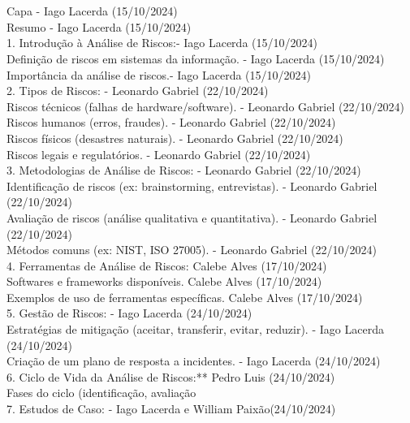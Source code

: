 \documentclass[12pt,oneside,a4paper,article]{abntex2}
\begin{document}
\section*{}
{Capa - Iago Lacerda (15/10/2024)\\
Resumo - Iago Lacerda (15/10/2024)\\
1. Introdução à Análise de Riscos:- Iago Lacerda (15/10/2024)\\
Definição de riscos em sistemas da informação. - Iago Lacerda (15/10/2024)\\
Importância da análise de riscos.- Iago Lacerda (15/10/2024)\\
2. Tipos de Riscos:  - Leonardo Gabriel (22/10/2024)\\
Riscos técnicos (falhas de hardware/software). -  Leonardo Gabriel (22/10/2024)\\
Riscos humanos (erros, fraudes). -  Leonardo Gabriel (22/10/2024)\\
Riscos físicos (desastres naturais). - Leonardo Gabriel (22/10/2024)\\
Riscos legais e regulatórios. - Leonardo Gabriel (22/10/2024)\\
3. Metodologias de Análise de Riscos: - Leonardo Gabriel (22/10/2024)
Identificação de riscos (ex: brainstorming, entrevistas). - Leonardo Gabriel (22/10/2024)\\
Avaliação de riscos (análise qualitativa e quantitativa).  - Leonardo Gabriel (22/10/2024)\\
Métodos comuns (ex: NIST, ISO 27005).  - Leonardo Gabriel (22/10/2024)\\
4. Ferramentas de Análise de Riscos: Calebe Alves (17/10/2024) \\
Softwares e frameworks disponíveis. Calebe Alves (17/10/2024)\\
Exemplos de uso de ferramentas específicas. Calebe Alves (17/10/2024) \\
5. Gestão de Riscos:  - Iago Lacerda (24/10/2024)\\
Estratégias de mitigação (aceitar, transferir, evitar, reduzir).  - Iago Lacerda (24/10/2024)\\
Criação de um plano de resposta a incidentes.  - Iago Lacerda (24/10/2024)\\
6. Ciclo de Vida da Análise de Riscos:** Pedro Luis (24/10/2024)\\
Fases do ciclo (identificação, avaliação\\
7. Estudos de Caso:  - Iago Lacerda e William Paixão(24/10/2024)\\
}
\end{document}
